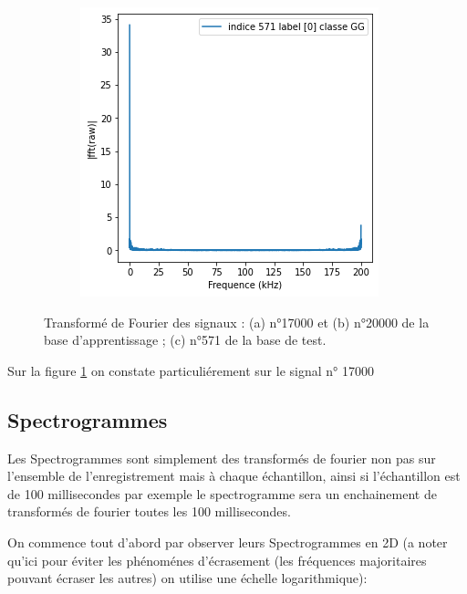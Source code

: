 \begin{figure}[!h]
\begin{subfigure}[b]{0.3\textwidth}
  \end{subfigure}
  \begin{subfigure}[b]{0.3\textwidth}
    \includegraphics[width=\textwidth]{./images/571fft.png}
  \end{subfigure}
  \caption{Transformé de Fourier des signaux : (a) n°17000 et (b) n°20000 de la base d'apprentissage ; (c) n°571 de la base de test.%
\label{fig:tf}}
\end{figure}

Sur la figure \ref{fig:tf} on constate particuliérement sur le signal n° 17000

\hypertarget{Spectrogrammes}{%
\subsection{Spectrogrammes}
\label{Spectrogrammes}}

Les Spectrogrammes sont simplement des transformés de fourier non pas sur l'ensemble de l'enregistrement mais à chaque échantillon, ainsi si l'échantillon est de 100 millisecondes par exemple le spectrogramme sera un enchainement de transformés de fourier toutes les 100 millisecondes.

On commence tout d'abord par observer leurs Spectrogrammes en 2D (a noter qu'ici pour éviter les phénoménes d'écrasement (les fréquences majoritaires pouvant écraser les autres) on utilise une échelle logarithmique):

